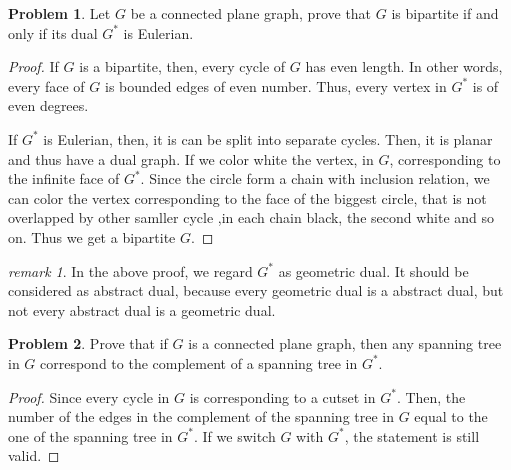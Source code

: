 \documentclass[a4paper,11pt]{article}%
\theoremstyle{remark}
\newtheorem*{remark}{remark}
\theoremstyle{definition}
\newtheorem{problem}{Problem}[subsection]
\begin{document}
\begin{problem}
    Let $G$ be a connected plane graph, prove that $G$ is bipartite if and only if its dual $G^*$ is Eulerian.
    \begin{proof}
        If $G$ is a bipartite, then, every cycle of $G$ has even length. In other words, every face of $G$ is bounded edges of even number.
        Thus, every vertex in $G^*$ is of even degrees.

        If $G^*$ is Eulerian, then, it is can be split into separate cycles.
        Then, it is planar and thus have a dual graph. If we color white the vertex, in $G$, corresponding to the infinite face of $G^*$.
        Since the circle form a chain with inclusion relation, we can color the vertex corresponding to the face of the biggest circle,
        that is not overlapped by other samller cycle ,in each chain black, the second white and so 
        on. Thus we get a bipartite $G$.
    \end{proof}
    \begin{remark}
        In the above proof, we regard $G^*$ as geometric dual. It should be considered as abstract dual, because every geometric dual is a
        abstract dual, but not every abstract dual is a geometric dual.
    \end{remark}
\end{problem}
\begin{problem}
    Prove that if $G$ is a connected plane graph, then any spanning tree in $G$ correspond to the complement of a spanning tree in $G^*$.
    \begin{proof}
    Since every cycle in $G$ is corresponding to a cutset in $G^*$. Then, the number of the edges in the complement of the spanning tree in $G$
    equal to the one of the spanning tree in $G^*$. If we switch $G$ with $G^*$, the statement is still valid. 
    \end{proof}
\end{problem}
\end{document}
